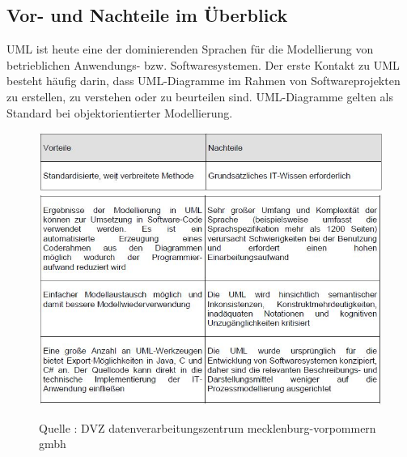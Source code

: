 \subsection{Vor- und Nachteile im Überblick}
UML ist heute eine der dominierenden Sprachen für die Modellierung von betrieblichen Anwendungs- bzw. Softwaresystemen. Der erste Kontakt zu UML besteht häufig darin, dass UML-Diagramme im Rahmen von Softwareprojekten zu erstellen, zu verstehen oder zu beurteilen sind. UML-Diagramme gelten als Standard bei objektorientierter Modellierung.\\

\begin{center}
\begin{figure}[h]
   

\includegraphics[scale=0.8]{Graphics/vornach.jpg}
\includegraphics[scale=0.8]{Graphics/vornach2.jpg} 


Quelle : DVZ datenverarbeitungszentrum mecklenburg-vorpommern gmbh 

 
\label{fig6}


\end{figure}

\end{center}
\newpage